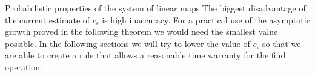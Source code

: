 \begin{section}{Probabilistic properties of the system of linear maps}
The biggest disadvantage of the current estimate of $c_\epsilon$ is high inaccuracy. For a practical use of the asymptotic growth proved in the following theorem we would need the smallest value possible. In the following sections we will try to lower the value of $c_\epsilon$ so that we are able to create a rule that allows a reasonable time warranty for the find operation.
\end{section}
